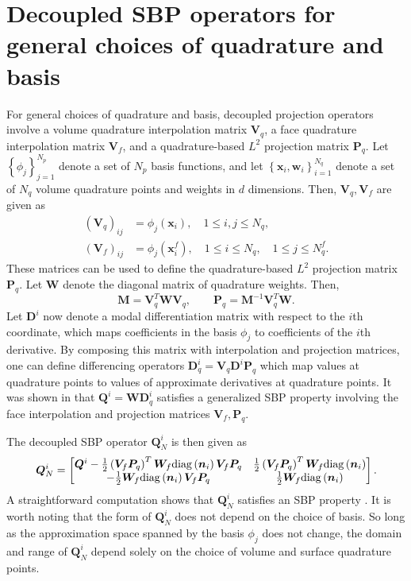 \documentclass[review,onefignum,onetabnum,final]{siamart171218}
\newcommand{\LRp}[1]{\left( #1 \right)}
\newcommand{\LRc}[1]{\left\{ #1 \right\}}
\newcommand{\diag}[1]{{\rm diag}\LRp{#1}}
\begin{document}
\section{Decoupled SBP operators for general choices of quadrature and basis}
\label{app:decoupled}

For general choices of quadrature and basis, decoupled projection operators involve a volume quadrature interpolation matrix $\bm{V}_q$, a face quadrature interpolation matrix $\bm{V}_f$, and a quadrature-based $L^2$ projection matrix $\bm{P}_q$.  Let $\LRc{\phi_j}_{j=1}^{N_p}$ denote a set of $N_p$ basis functions, and let $\LRc{\bm{x}_i, \bm{w}_i}_{i = 1}^{N_q}$ denote a set of $N_q$ volume quadrature points and weights in $d$ dimensions.  
Then, $\bm{V}_q, \bm{V}_f$ are given as 
\begin{align*}
\LRp{\bm{V}_q}_{ij} &= \phi_j(\bm{x}_i), \quad 1 \leq i,j \leq N_q,\\
\LRp{\bm{V}_f}_{ij} &= \phi_j\LRp{\bm{x}^f_i}, \quad 1 \leq i \leq N_q, \quad 1\leq j \leq N^f_q.
\end{align*}
These matrices can be used to define the quadrature-based $L^2$ projection matrix $\bm{P}_q$.  Let $\bm{W}$ denote the diagonal matrix of quadrature weights.  Then, 
\[
\bm{M} = \bm{V}_q^T\bm{W}\bm{V}_q, \qquad \bm{P}_q = \bm{M}^{-1}\bm{V}_q^T\bm{W}.  
\]
Let $\bm{D}^i$ now denote a modal differentiation matrix with respect to the $i$th coordinate, which maps coefficients in the basis $\phi_j$ to coefficients of the $i$th derivative.  By composing this matrix with interpolation and projection matrices, one can define differencing operators $\bm{D}_q^i = \bm{V}_q\bm{D}^i\bm{P}_q$ which map values at quadrature points to values of approximate derivatives at quadrature points. It was shown in \cite{chan2017discretely} that $\bm{Q}^i = \bm{W}\bm{D}_q^i$ satisfies a generalized SBP property involving the face interpolation and projection matrices $\bm{V}_f, \bm{P}_q$.  

The decoupled SBP operator $\bm{Q}_N^i$ is then given as
\begin{equation}
\bm{Q}_N^i = \begin{bmatrix}
\bm{Q}^i - \frac{1}{2}\LRp{\bm{V}_f\bm{P}_q}^T\bm{W}_f \diag{\bm{n}_i}{\bm{V}_f\bm{P}_q} & \frac{1}{2}\LRp{\bm{V}_f\bm{P}_q}^T\bm{W}_f \diag{\bm{n}_i}\\
-\frac{1}{2}\bm{W}_f \diag{\bm{n}_i}{\bm{V}_f\bm{P}_q} & \frac{1}{2}\bm{W}_f \diag{\bm{n}_i}
\end{bmatrix}.
\label{eq:qni_quad}
\end{equation}
A straightforward computation shows that $\bm{Q}_N^i$ satisfies an SBP property \cite{chan2017discretely}.  
It is worth noting that the form of $\bm{Q}_N^i$ does not depend on the choice of basis.  So long as the approximation space spanned by the basis $\phi_j$ does not change, the domain and range of $\bm{Q}_N^i$ depend solely on the choice of volume and surface quadrature points.  
\end{document}
